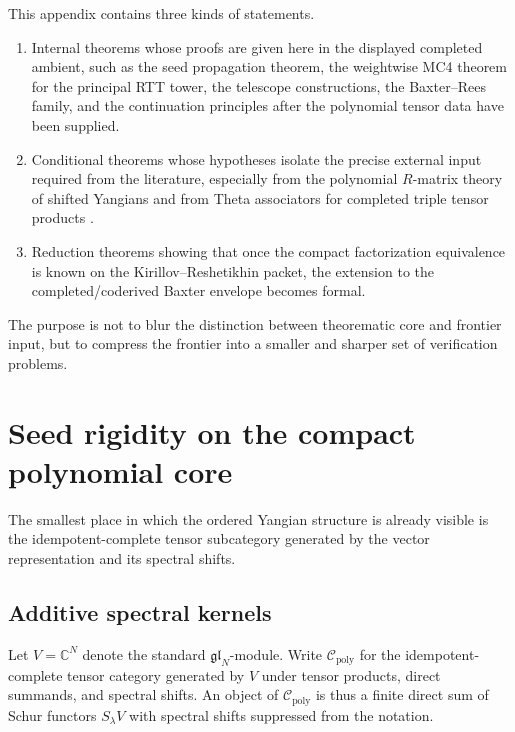 \begin{remark}
\label{rem:typeA-status-scope}
This appendix contains three kinds of statements.
\begin{enumerate}
 \item Internal theorems whose proofs are given here in the displayed
 completed ambient, such as the seed propagation theorem, the
 weightwise MC4 theorem for the principal RTT tower, the telescope
 constructions, the Baxter--Rees family, and the continuation
 principles after the polynomial tensor data have been supplied.
 \item Conditional theorems whose hypotheses isolate the precise
 external input required from the literature, especially from the
 polynomial $R$-matrix theory of shifted Yangians and from Theta
 associators for completed triple tensor products
 \cite{HZ24,ZhangTheta24}.
 \item Reduction theorems showing that once the compact factorization
 equivalence is known on the Kirillov--Reshetikhin packet, the
 extension to the completed/coderived Baxter envelope becomes formal.
\end{enumerate}
The purpose is not to blur the distinction between theorematic core and
frontier input, but to compress the frontier into a smaller and sharper
set of verification problems.
\end{remark}

\section{Seed rigidity on the compact polynomial core}
\label{sec:typeA-seed-rigidity}

The smallest place in which the ordered Yangian structure is already
visible is the idempotent-complete tensor subcategory generated by the
vector representation and its spectral shifts.

\subsection{Additive spectral kernels}

Let $V=\mathbb C^N$ denote the standard $\mathfrak{gl}_N$-module. Write
$\mathcal C_{\mathrm{poly}}$ for the idempotent-complete tensor category
generated by $V$ under tensor products, direct summands, and spectral
shifts. An object of $\mathcal C_{\mathrm{poly}}$ is thus a finite direct
sum of Schur functors $S_\lambda V$ with spectral shifts suppressed from
the notation.

